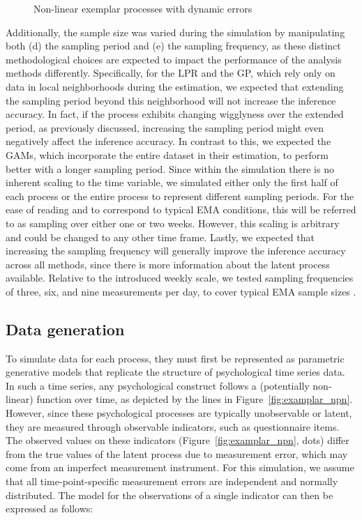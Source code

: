 \documentclass[man, floatsintext]{apa7}
\begin{document}
\begin{figure*}[!t]
  \caption{Non-linear exemplar processes with dynamic errors}
  \label{fig:exemplar_pn}
\end{figure*}

Additionally, the sample size was varied during the simulation by manipulating
both (d) the sampling period and (e) the sampling frequency, as these distinct
methodological choices are expected to impact the performance of the analysis
methods differently. Specifically, for the LPR and the GP, which rely only on
data in local neighborhoods during the estimation, we expected that extending
the sampling period beyond this neighborhood will not increase the inference
accuracy. In fact, if the process exhibits changing wigglyness over the
extended period, as previously discussed, increasing the sampling period might
even negatively affect the inference accuracy. In contrast to this, we expected
the GAMs, which incorporate the entire dataset in their estimation, to perform
better with a longer sampling period. Since within the simulation there is no
inherent scaling to the time variable, we simulated either only the first half
of each process or the entire process to represent different sampling periods.
For the ease of reading and to correspond to typical EMA conditions, this will
be referred to as sampling over either one or two weeks. However, this scaling
is arbitrary and could be changed to any other time frame. Lastly, we expected
that increasing the sampling frequency will generally improve the inference
accuracy across all methods, since there is more information about the latent
process available. Relative to the introduced weekly scale, we tested sampling
frequencies of three, six, and nine measurements per day, to cover typical EMA
sample sizes \parencite{wrzus_ecological_2023}.

\subsection{Data generation}

To simulate data for each process, they must first be represented as parametric
generative models that replicate the structure of psychological time series
data. In such a time series, any psychological construct follows a (potentially
non-linear) function over time, as depicted by the lines in
Figure~\ref{fig:examplar_npn}. However, since these psychological processes are
typically unobservable or latent, they are measured through observable
indicators, such as questionnaire items. The observed values on these
indicators (Figure~\ref{fig:examplar_npn}, dots) differ from the true values of
the latent process due to measurement error, which may come from an imperfect
measurement instrument. For this simulation, we assume that all
time-point-specific measurement errors are independent and normally
distributed. The model for the observations of a single indicator can then be
expressed as follows:
\end{document}
